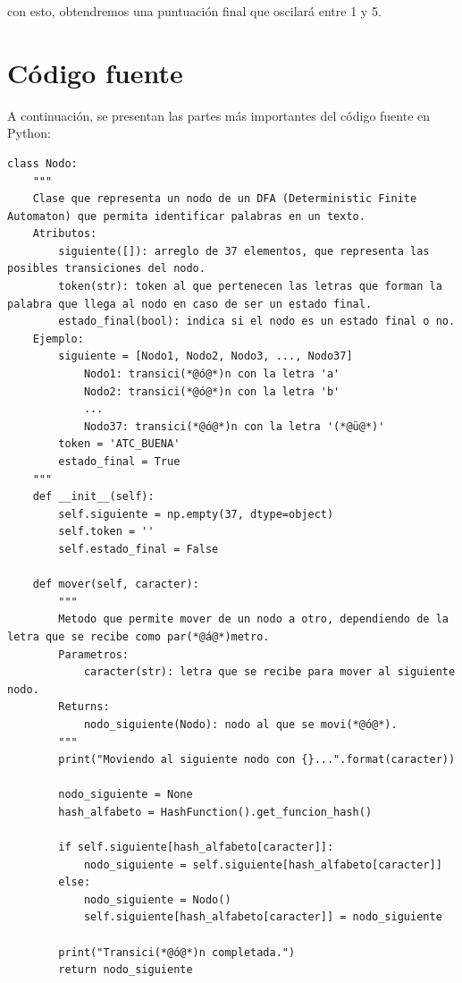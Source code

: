 \documentclass[10pt,times,twocolumn]{article}
\begin{document}
con esto, obtendremos una puntuación final que oscilará entre 1 y 5.

\section{Código fuente}

A continuación, se presentan las partes más importantes del código fuente en Python:


\begin{lstlisting}[caption={Clase Nodo}, xleftmargin=0.05\textwidth]
class Nodo:
    """
    Clase que representa un nodo de un DFA (Deterministic Finite Automaton) que permita identificar palabras en un texto.
    Atributos:
        siguiente([]): arreglo de 37 elementos, que representa las posibles transiciones del nodo.
        token(str): token al que pertenecen las letras que forman la palabra que llega al nodo en caso de ser un estado final.
        estado_final(bool): indica si el nodo es un estado final o no.
    Ejemplo:
        siguiente = [Nodo1, Nodo2, Nodo3, ..., Nodo37]
            Nodo1: transici(*@ó@*)n con la letra 'a'
            Nodo2: transici(*@ó@*)n con la letra 'b'
            ...
            Nodo37: transici(*@ó@*)n con la letra '(*@ü@*)'
        token = 'ATC_BUENA'
        estado_final = True
    """
    def __init__(self):
        self.siguiente = np.empty(37, dtype=object)
        self.token = ''
        self.estado_final = False

    def mover(self, caracter):
        """
        Metodo que permite mover de un nodo a otro, dependiendo de la letra que se recibe como par(*@á@*)metro.
        Parametros:
            caracter(str): letra que se recibe para mover al siguiente nodo.
        Returns:
            nodo_siguiente(Nodo): nodo al que se movi(*@ó@*).
        """
        print("Moviendo al siguiente nodo con {}...".format(caracter))

        nodo_siguiente = None
        hash_alfabeto = HashFunction().get_funcion_hash()
        
        if self.siguiente[hash_alfabeto[caracter]]:
            nodo_siguiente = self.siguiente[hash_alfabeto[caracter]]
        else:
            nodo_siguiente = Nodo()
            self.siguiente[hash_alfabeto[caracter]] = nodo_siguiente 

        print("Transici(*@ó@*)n completada.")
        return nodo_siguiente
\end{lstlisting}
\end{document}
